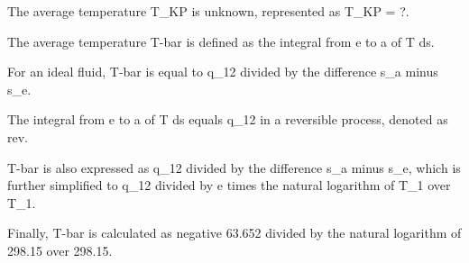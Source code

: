 The average temperature T_KP is unknown, represented as T_KP = ?.

The average temperature T-bar is defined as the integral from e to a of T ds.

For an ideal fluid, T-bar is equal to q_12 divided by the difference s_a minus s_e.

The integral from e to a of T ds equals q_12 in a reversible process, denoted as rev.

T-bar is also expressed as q_12 divided by the difference s_a minus s_e, which is further simplified to q_12 divided by e times the natural logarithm of T_1 over T_1.

Finally, T-bar is calculated as negative 63.652 divided by the natural logarithm of 298.15 over 298.15.
